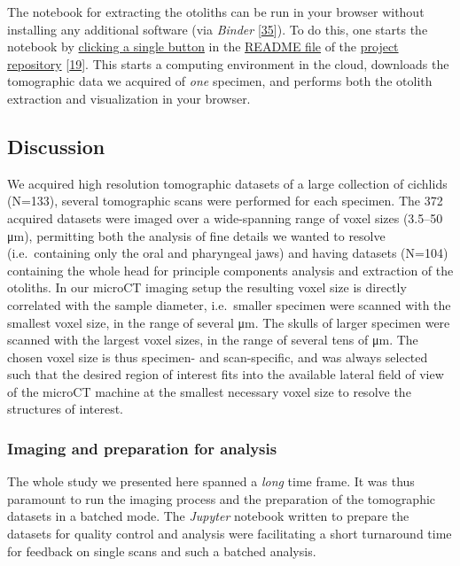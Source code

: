 The notebook for extracting the otoliths can be run in your browser without installing any additional software (via \emph{Binder} {[}\protect\hyperlink{ref-Q20Bxdsr}{35}{]}).
To do this, one starts the notebook by \href{https://mybinder.org/v2/gh/habi/eawag/HEAD?labpath=ExtractOtoliths.ipynb}{clicking a single button} in the \href{https://github.com/habi/EAWAG/blob/master/README.md}{README file} of the \href{https://github.com/habi/EAWAG}{project repository} {[}\protect\hyperlink{ref-1HteOscVd}{19}{]}.
This starts a computing environment in the cloud, downloads the tomographic data we acquired of \emph{one} specimen, and performs both the otolith extraction and visualization in your browser.

\hypertarget{discussion}{%
\subsection{Discussion}\label{discussion}}

We acquired high resolution tomographic datasets of a large collection of cichlids (N=133), several tomographic scans were performed for each specimen.
The 372 acquired datasets were imaged over a wide-spanning range of voxel sizes (3.5--50 μm), permitting both the analysis of fine details we wanted to resolve (i.e.~containing only the oral and pharyngeal jaws) and having datasets (N=104) containing the whole head for principle components analysis and extraction of the otoliths.
In our microCT imaging setup the resulting voxel size is directly correlated with the sample diameter, i.e.~smaller specimen were scanned with the smallest voxel size, in the range of several μm.
The skulls of larger specimen were scanned with the largest voxel sizes, in the range of several tens of μm.
The chosen voxel size is thus specimen- and scan-specific, and was always selected such that the desired region of interest fits into the available lateral field of view of the microCT machine at the smallest necessary voxel size to resolve the structures of interest.

\hypertarget{imaging-and-preparation-for-analysis}{%
\subsubsection{Imaging and preparation for analysis}\label{imaging-and-preparation-for-analysis}}

The whole study we presented here spanned a \emph{long} time frame.
It was thus paramount to run the imaging process and the preparation of the tomographic datasets in a batched mode.
The \emph{Jupyter} notebook written to prepare the datasets for quality control and analysis were facilitating a short turnaround time for feedback on single scans and such a batched analysis.

